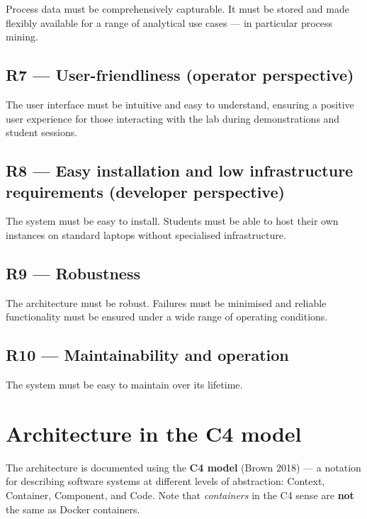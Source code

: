 \documentclass[
  english,
  11pt,
  a4paper,
]{scrbook}
\begin{document}
Process data must be comprehensively capturable. It must be stored and
made flexibly available for a range of analytical use cases --- in
particular process mining.

\subsection{R7 --- User-friendliness (operator
perspective)}\label{r7-user-friendliness-operator-perspective}

The user interface must be intuitive and easy to understand, ensuring a
positive user experience for those interacting with the lab during
demonstrations and student sessions.

\subsection{R8 --- Easy installation and low infrastructure requirements
(developer
perspective)}\label{r8-easy-installation-and-low-infrastructure-requirements-developer-perspective}

The system must be easy to install. Students must be able to host their
own instances on standard laptops without specialised infrastructure.

\subsection{R9 --- Robustness}\label{r9-robustness}

The architecture must be robust. Failures must be minimised and reliable
functionality must be ensured under a wide range of operating
conditions.

\subsection{R10 --- Maintainability and
operation}\label{r10-maintainability-and-operation}

The system must be easy to maintain over its lifetime.

\section{Architecture in the C4
model}\label{architecture-in-the-c4-model}

The architecture is documented using the \textbf{C4 model} (Brown 2018)
--- a notation for describing software systems at different levels of
abstraction: Context, Container, Component, and Code. Note that
\emph{containers} in the C4 sense are \textbf{not} the same as Docker
containers.
\end{document}
